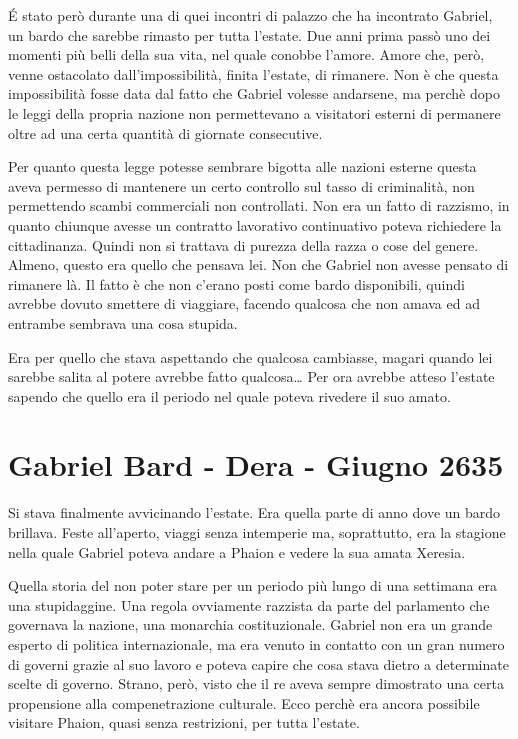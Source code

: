     \'E stato però durante una di quei incontri di palazzo che ha
    incontrato Gabriel, un bardo che sarebbe rimasto per tutta l'estate.
    Due anni prima passò uno dei momenti più belli della sua vita, nel
    quale conobbe l'amore. Amore che, però, venne ostacolato
    dall'impossibilità, finita l'estate, di rimanere. Non è che questa
    impossibilità fosse data dal fatto che Gabriel volesse andarsene, ma
    perchè dopo le leggi della propria nazione non permettevano a visitatori
    esterni di permanere oltre ad una certa quantità di giornate
    consecutive.

    Per quanto questa legge potesse sembrare bigotta alle nazioni esterne
    questa aveva permesso di mantenere un certo controllo sul tasso di
    criminalità, non permettendo scambi commerciali non controllati. Non
    era un fatto di razzismo, in quanto chiunque avesse un contratto
    lavorativo continuativo poteva richiedere la cittadinanza. Quindi non
    si trattava di purezza della razza o cose del genere. Almeno, questo
    era quello che pensava lei. Non che Gabriel non avesse pensato di
    rimanere là. Il fatto è che non c'erano posti come bardo disponibili,
    quindi avrebbe dovuto smettere di viaggiare, facendo qualcosa che non
    amava ed ad entrambe sembrava una cosa stupida.

    Era per quello che stava aspettando che qualcosa cambiasse, magari
    quando lei sarebbe salita al potere avrebbe fatto qualcosa\dots{} Per
    ora avrebbe atteso l'estate sapendo che quello era il periodo nel quale
    poteva rivedere il suo amato.

    \section{Gabriel Bard - Dera - Giugno 2635}
    Si stava finalmente avvicinando l'estate. Era quella parte di anno dove
    un bardo brillava. Feste all'aperto, viaggi senza intemperie ma,
    soprattutto, era la stagione nella quale Gabriel poteva andare a Phaion
    e vedere la sua amata Xeresia.

    Quella storia del non poter stare per un periodo più lungo di una
    settimana era una stupidaggine. Una regola ovviamente razzista da parte
    del parlamento che governava la nazione, una monarchia costituzionale.
    Gabriel non era un grande esperto di politica internazionale, ma era
    venuto in contatto con un gran numero di governi grazie al suo lavoro e
    poteva capire che cosa stava dietro a determinate scelte di governo.
    Strano, però, visto che il re aveva sempre dimostrato una certa
    propensione alla compenetrazione culturale. Ecco perchè era ancora
    possibile visitare Phaion, quasi senza restrizioni, per tutta l'estate. 

